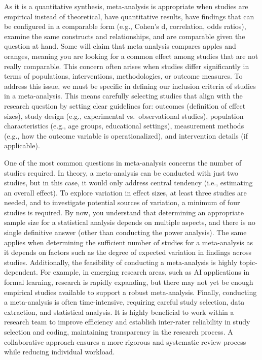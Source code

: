 \documentclass[
  letterpaper,
  DIV=11,
  numbers=noendperiod]{scrreprt}
\begin{document}
As it is a quantitative synthesis, meta-analysis is appropriate when
studies are empirical instead of theoretical, have quantitative results,
have findings that can be configured in a comparable form (e.g., Cohen's
d, correlation, odds ratios), examine the same constructs and
relationships, and are comparable given the question at hand. Some will
claim that meta-analysis compares apples and oranges, meaning you are
looking for a common effect among studies that are not really
comparable. This concern often arises when studies differ significantly
in terms of populations, interventions, methodologies, or outcome
measures. To address this issue, we must be specific in defining our
inclusion criteria of studies in a meta-analysis. This means carefully
selecting studies that align with the research question by setting clear
guidelines for: outcomes (definition of effect sizes), study design
(e.g., experimental vs.~observational studies), population
characteristics (e.g., age groups, educational settings), measurement
methods (e.g., how the outcome variable is operationalized), and
intervention details (if applicable).

One of the most common questions in meta-analysis concerns the number of
studies required. In theory, a meta-analysis can be conducted with just
two studies, but in this case, it would only address central tendency
(i.e., estimating an overall effect). To explore variation in effect
sizes, at least three studies are needed, and to investigate potential
sources of variation, a minimum of four studies is required. By now, you
understand that determining an appropriate sample size for a statistical
analysis depends on multiple aspects, and there is no single definitive
answer (other than conducting the power analysis). The same applies when
determining the sufficient number of studies for a meta-analysis as it
depends on factors such as the degree of expected variation in findings
across studies. Additionally, the feasibility of conducting a
meta-analysis is highly topic-dependent. For example, in emerging
research areas, such as AI applications in formal learning, research is
rapidly expanding, but there may not yet be enough empirical studies
available to support a robust meta-analysis. Finally, conducting a
meta-analysis is often time-intensive, requiring careful study
selection, data extraction, and statistical analysis. It is highly
beneficial to work within a research team to improve efficiency and
establish inter-rater reliability in study selection and coding,
maintaining transparency in the research process. A collaborative
approach ensures a more rigorous and systematic review process while
reducing individual workload.
\end{document}
